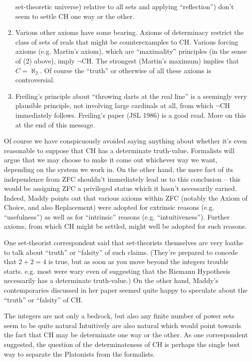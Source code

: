 \begin{enumerate}
    set-theoretic universe) relative to all sets and applying ``reflection'')
    don't seem to settle CH one way or the other.
\item Various other axioms have some bearing.  Axioms of determinacy restrict
    the class of sets of reals that might be counterexamples to CH.  Various
    forcing axioms (e.g. Martin's axiom), which are ``maximality'' principles
    (in the sense of (2) above), imply $\neg$CH.  The strongest (Martin's maximum)
    implies that $C = \aleph_2$.  Of course the ``truth'' or otherwise of all
    these axioms is controversial.
\item Freiling's principle about ``throwing darts at the real line'' is a
    seemingly very plausible principle, not involving large cardinals at
    all, from which $\neg$CH immediately follows.  Freiling's paper (JSL 1986)
    is a good read.  More on this at the end of this message.
\end{enumerate}

Of course we have conspicuously avoided saying anything about whether it's
even reasonable to suppose that CH has a determinate truth-value.
Formalists will argue that we may choose to make it come out whichever
way we want, depending on the system we work in.  On the other hand,
the mere fact of its independence from ZFC shouldn't immediately lead
us to this conclusion -- this would be assigning ZFC a privileged status
which it hasn't necessarily earned.  Indeed, Maddy points out that
various axioms within ZFC (notably the Axiom of Choice, and also
Replacement) were adopted for extrinsic reasons (e.g. ``usefulness'')
as well as for ``intrinsic'' reasons (e.g. ``intuitiveness'').  Further
axioms, from which CH might be settled, might well be adopted for such
reasons.

One set-theorist correspondent said that set-theorists themselves are very
loathe to talk about ``truth'' or ``falsity'' of such claims.  (They're
prepared to concede that $2+2=4$ is true, but as soon as you move beyond
the integers trouble starts.  e.g. most were wary even of suggesting that
the Riemann Hypothesis necessarily has a determinate truth-value.)  On
the other hand, Maddy's contemporaries discussed in her paper seemed quite
happy to speculate about the ``truth'' or ``falsity'' of CH.

The integers are not only a bedrock, but also
any finite number of power sets seem to be quite natural
Intuitively are also natural which would point towards the fact
that  CH may be determinate
one way or the other.  As one correspondent suggested, the question of the
determinateness of CH is perhaps the single best way to separate the
Platonists from the formalists.


